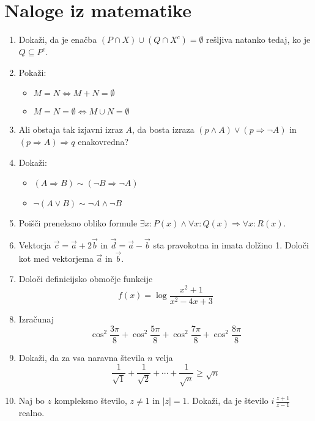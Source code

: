\documentclass[a4paper,12pt]{article}
\begin{document}
\section*{Naloge iz matematike}

\begin{enumerate}

\item
Dokaži, da je enačba $(P \cap X) \cup (Q \cap X^c) = \emptyset$
rešljiva natanko tedaj, ko je $Q \subseteq P^c$.

\item
Pokaži:
\begin{itemize}
   \item $M = N \iff M + N = \emptyset$
   \item $M = N = \emptyset \iff M \cup N = \emptyset$
\end{itemize}

\item
Ali obstaja tak izjavni izraz $A$, da bosta izraza
$(p \land A) \lor (p \Rightarrow \lnot A)$ in $(p \Rightarrow A) \Rightarrow q$
enakovredna?

\item
Dokaži:
\begin{itemize}
   \item $(A \Rightarrow B) \sim (\lnot B \Rightarrow \lnot A)$
   \item $\lnot (A \lor B) \sim \lnot A \land \lnot B$
\end{itemize}

\item
Poišči preneksno obliko formule $\exists x: P(x) \land \forall x: Q(x) \Rightarrow \forall x: R(x)$.

\item
Vektorja $\vec{c} = \vec{a} + 2\vec{b}$ in $\vec{d} = \vec{a} - \vec{b}$
sta pravokotna in imata dolžino 1. Določi kot med vektorjema $\vec{a}$ in $\vec{b}$.

\item
Določi definicijsko območje funkcije
$$ f(x) = \log \frac{x^2+1}{x^2-4x+3} $$

\item
Izračunaj
$$ \cos^2 \frac{3\pi}{8} + \cos^2 \frac{5\pi}{8} + \cos^2 \frac{7\pi}{8} + \cos^2 \frac{8\pi}{8} $$

\item
Dokaži, da za vsa naravna števila $n$ velja
$$ \frac{1}{\sqrt{1}} + \frac{1}{\sqrt{2}} + \cdots + \frac{1}{\sqrt{n}} \ge \sqrt{n} $$

\item
Naj bo $z$ kompleksno število, $z \ne 1$ in $|z| = 1$.
Dokaži, da je število $i\,\frac{z+1}{z-1}$ realno.


\end{enumerate}
\end{document}
